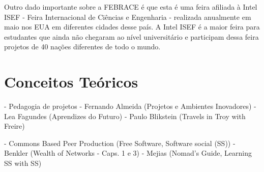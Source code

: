  Outro dado importante sobre a FEBRACE é que esta é uma feira afiliada à Intel ISEF - Feira Internacional de Ciências e Engenharia - realizada anualmente em maio nos EUA em diferentes cidades desse país. A Intel ISEF é a maior feira para estudantes que ainda não chegaram ao nível universitário e participam dessa feira projetos de 40 nações diferentes de todo o mundo.

  \section{Conceitos Teóricos}

  - Pedagogia de projetos
    - Fernando Almeida (Projetos e Ambientes Inovadores)
    - Lea Fagundes (Aprendizes do Futuro)
    - Paulo Blikstein (Travels in Troy with Freire)

  - Commons Based Peer Production (Free Software, Software social (SS))
    - Benkler (Wealth of Networks - Caps. 1 e 3)
    - Mejias (Nomad's Guide, Learning SS with SS)
